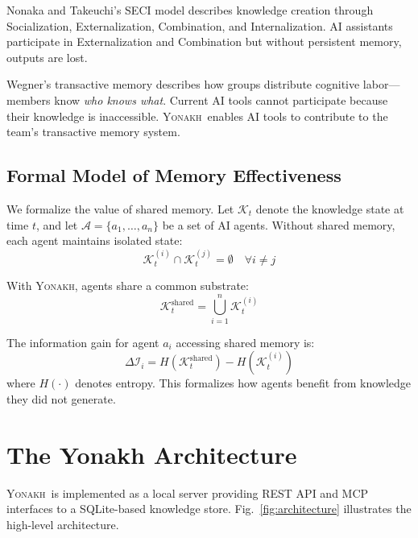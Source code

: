 \documentclass[10pt,journal,compsoc]{IEEEtran}
\newcommand{\yonakh}{\textsc{Yonakh}}
\begin{document}
Nonaka and Takeuchi's SECI model \cite{nonaka1995knowledge} describes knowledge creation through Socialization, Externalization, Combination, and Internalization. AI assistants participate in Externalization and Combination but without persistent memory, outputs are lost.

Wegner's transactive memory \cite{wegner1987transactive} describes how groups distribute cognitive labor---members know \emph{who knows what}. Current AI tools cannot participate because their knowledge is inaccessible. \yonakh\ enables AI tools to contribute to the team's transactive memory system.

\subsection{Formal Model of Memory Effectiveness}

We formalize the value of shared memory. Let $\mathcal{K}_t$ denote the knowledge state at time $t$, and let $\mathcal{A} = \{a_1, \ldots, a_n\}$ be a set of AI agents. Without shared memory, each agent maintains isolated state:
\begin{equation}
\mathcal{K}_t^{(i)} \cap \mathcal{K}_t^{(j)} = \emptyset \quad \forall i \neq j
\end{equation}

With \yonakh, agents share a common substrate:
\begin{equation}
\mathcal{K}_t^{\text{shared}} = \bigcup_{i=1}^{n} \mathcal{K}_t^{(i)}
\end{equation}

The information gain for agent $a_i$ accessing shared memory is:
\begin{equation}
\Delta\mathcal{I}_i = H(\mathcal{K}_t^{\text{shared}}) - H(\mathcal{K}_t^{(i)})
\end{equation}
where $H(\cdot)$ denotes entropy. This formalizes how agents benefit from knowledge they did not generate.

\section{The Yonakh Architecture}

\yonakh\ is implemented as a local server providing REST API and MCP interfaces to a SQLite-based knowledge store. Fig.~\ref{fig:architecture} illustrates the high-level architecture.
\end{document}
